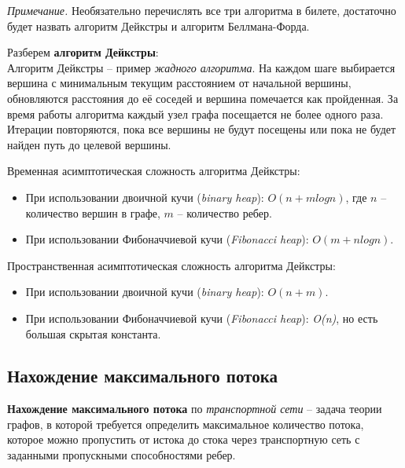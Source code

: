 {\footnotesize \textit{Примечание.} Необязательно перечислять все три алгоритма в билете, достаточно будет назвать алгоритм Дейкстры и алгоритм Беллмана-Форда.}
\vspace{10pt}

Разберем \textbf{алгоритм Дейкстры}:\\
Алгоритм Дейкстры -- пример  \textit{жадного алгоритма}. На каждом шаге выбирается вершина с минимальным текущим расстоянием от начальной вершины, обновляются расстояния до её соседей и вершина помечается как пройденная. За время работы алгоритма каждый узел графа посещается не более одного раза. Итерации повторяются, пока все вершины не будут посещены или пока не будет найден путь до целевой вершины. \newline

Временная асимптотическая сложность алгоритма Дейкстры: 
\begin{itemize}[label=$\triangleright$, font=\scriptsize, noitemsep, topsep=0pt, partopsep=0pt]
	\item {\footnotesize При использовании двоичной кучи (\textit{binary heap}): \textit{$O(n + mlogn)$}, где $n$ -- количество вершин в графе, $m$ -- количество ребер.}
	\item {\footnotesize При использовании Фибоначчиевой кучи (\textit{Fibonacci heap}): \textit{$O(m + nlogn)$}.}
\end{itemize}
\vspace{5pt}

Пространственная асимптотическая сложность алгоритма Дейкстры: 
\begin{itemize}[label=$\triangleright$, font=\scriptsize, noitemsep, topsep=0pt, , partopsep=0pt]
	\item {\footnotesize При использовании двоичной кучи (\textit{binary heap}): \textit{$O(n + m)$}.}
	\item {\footnotesize При использовании Фибоначчиевой кучи (\textit{Fibonacci heap}): \textit{O(n)}, но есть большая скрытая константа.}
\end{itemize}

\subsection{Нахождение максимального потока}
\textbf{Нахождение максимального потока} по \textit{транспортной сети} -- задача теории графов, в которой требуется определить максимальное количество потока, которое можно пропустить от истока до стока через транспортную сеть с заданными пропускными способностями ребер.

